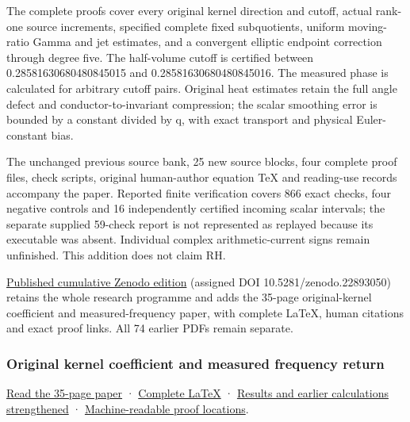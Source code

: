 \documentclass[
]{article}
\begin{document}
The complete proofs cover every original kernel direction and cutoff,
actual rank-one source increments, specified complete fixed
subquotients, uniform moving-ratio Gamma and jet estimates, and a
convergent elliptic endpoint correction through degree five. The
half-volume cutoff is certified between 0.28581630680480845015 and
0.28581630680480845016. The measured phase is calculated for arbitrary
cutoff pairs. Original heat estimates retain the full angle defect and
conductor-to-invariant compression; the scalar smoothing error is
bounded by a constant divided by q, with exact transport and physical
Euler-constant bias.

The unchanged previous source bank, 25 new source blocks, four complete
proof files, check scripts, original human-author equation TeX and
reading-use records accompany the paper. Reported finite verification
covers 866 exact checks, four negative controls and 16 independently
certified incoming scalar intervals; the separate supplied 59-check
report is not represented as replayed because its executable was absent.
Individual complex arithmetic-current signs remain unfinished. This
addition does not claim RH.

\href{https://zenodo.org/records/22893050}{Published cumulative Zenodo
edition} (assigned DOI 10.5281/zenodo.22893050) retains the whole
research programme and adds the 35-page original-kernel coefficient and
measured-frequency paper, with complete LaTeX, human citations and exact
proof links. All 74 earlier PDFs remain separate.

\subsubsection{Original kernel coefficient and measured frequency
return}\label{original-kernel-coefficient-and-measured-frequency-return}

\href{https://github.com/KokunoYumeto/zeta-function-research-reader/blob/main/workbenches/splitzero-tandem/continuations/20260922-kernel-frequency/KERNEL_AND_FREQUENCY_READER.pdf}{Read
the 35-page paper} ·
\href{https://github.com/KokunoYumeto/zeta-function-research-reader/blob/main/workbenches/splitzero-tandem/continuations/20260922-kernel-frequency/KERNEL_AND_FREQUENCY_READER.tex}{Complete
LaTeX} ·
\href{https://github.com/KokunoYumeto/zeta-function-research-reader/blob/main/workbenches/splitzero-tandem/continuations/20260922-kernel-frequency/RESULTS_20260922_024.md}{Results
and earlier calculations strengthened} ·
\href{https://github.com/KokunoYumeto/zeta-function-research-reader/blob/main/workbenches/splitzero-tandem/continuations/20260922-kernel-frequency/RESULT_INDEX.json}{Machine-readable
proof locations}.
\end{document}
